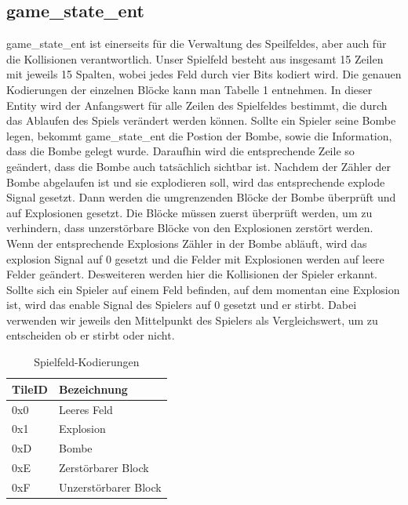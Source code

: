 \documentclass[parskip=full]{scrartcl}
\begin{document}
			\subsection{game\_state\_ent}
				game\_state\_ent ist einerseits für die Verwaltung des Speilfeldes, aber auch für die Kollisionen verantwortlich. Unser Spielfeld besteht aus insgesamt 15 Zeilen mit jeweils 15 Spalten, wobei jedes Feld durch vier Bits kodiert wird. Die genauen Kodierungen der einzelnen Blöcke kann man Tabelle 1 entnehmen. In dieser Entity wird der Anfangswert für alle Zeilen des Spielfeldes bestimmt, die durch das Ablaufen des Spiels verändert werden können. \newline
				Sollte ein Spieler seine Bombe legen, bekommt game\_state\_ent die Postion der Bombe, sowie die Information, dass die Bombe gelegt wurde. Daraufhin wird die entsprechende Zeile so geändert, dass die Bombe auch tatsächlich sichtbar ist. Nachdem der Zähler der Bombe abgelaufen ist und sie explodieren soll, wird das entsprechende explode Signal gesetzt. Dann werden die umgrenzenden Blöcke der Bombe überprüft und auf Explosionen gesetzt. Die Blöcke müssen zuerst überprüft werden, um zu verhindern, dass unzerstörbare Blöcke von den Explosionen zerstört werden. Wenn der entsprechende Explosions Zähler in der Bombe abläuft, wird das explosion Signal auf 0 gesetzt und die Felder mit Explosionen werden auf leere Felder geändert. \newline
				Desweiteren werden hier die Kollisionen der Spieler erkannt. Sollte sich ein Spieler auf einem Feld befinden, auf dem momentan eine Explosion ist, wird das enable Signal des Spielers auf 0 gesetzt und er stirbt. Dabei verwenden wir jeweils den Mittelpunkt des Spielers als Vergleichswert, um zu entscheiden ob er stirbt oder nicht. \newline
				
				\begin{table}[H]
					\centering
					\label{tileCode}
					\begin{tabular}{|l|l|}
						\hline
						\textbf{TileID} & \textbf{Bezeichnung}      \\ \hline
						0x0           & Leeres Feld               \\ \hline
						0x1           & Explosion                 \\ \hline
						0xD           & Bombe                     \\ \hline
						0xE           & Zerstörbarer Block        \\ \hline
						0xF           & Unzerstörbarer Block      \\ \hline
					\end{tabular}
					\caption{Spielfeld-Kodierungen}
				\end{table}
\end{document}
